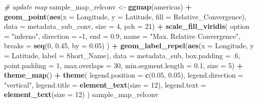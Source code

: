 \documentclass[
]{article}
\newenvironment{Shaded}{\begin{snugshade}}{\end{snugshade}}
\newcommand{\AttributeTok}[1]{\textcolor[rgb]{0.13,0.29,0.53}{#1}}
\newcommand{\CommentTok}[1]{\textcolor[rgb]{0.56,0.35,0.01}{\textit{#1}}}
\newcommand{\DecValTok}[1]{\textcolor[rgb]{0.00,0.00,0.81}{#1}}
\newcommand{\FloatTok}[1]{\textcolor[rgb]{0.00,0.00,0.81}{#1}}
\newcommand{\FunctionTok}[1]{\textcolor[rgb]{0.13,0.29,0.53}{\textbf{#1}}}
\newcommand{\NormalTok}[1]{#1}
\newcommand{\OtherTok}[1]{\textcolor[rgb]{0.56,0.35,0.01}{#1}}
\newcommand{\SpecialCharTok}[1]{\textcolor[rgb]{0.81,0.36,0.00}{\textbf{#1}}}
\newcommand{\StringTok}[1]{\textcolor[rgb]{0.31,0.60,0.02}{#1}}
\begin{document}
\begin{Shaded}
\begin{Highlighting}[]
\CommentTok{\# update map}
\NormalTok{sample\_map\_relconv }\OtherTok{\textless{}{-}} \FunctionTok{ggmap}\NormalTok{(americas) }\SpecialCharTok{+}
  \FunctionTok{geom\_point}\NormalTok{(}\FunctionTok{aes}\NormalTok{(}\AttributeTok{x =}\NormalTok{ Longitude, }\AttributeTok{y =}\NormalTok{ Latitude, }\AttributeTok{fill =}\NormalTok{ Relative\_Convergence), }\AttributeTok{data =}\NormalTok{ metadata\_sub\_conv, }\AttributeTok{size =} \DecValTok{4}\NormalTok{, }\AttributeTok{pch =} \DecValTok{21}\NormalTok{) }\SpecialCharTok{+}
  \FunctionTok{scale\_fill\_viridis}\NormalTok{(}
    \AttributeTok{option =} \StringTok{"inferno"}\NormalTok{, }\AttributeTok{direction =} \SpecialCharTok{{-}}\DecValTok{1}\NormalTok{, }\AttributeTok{end =} \FloatTok{0.9}\NormalTok{,}
    \AttributeTok{name =} \StringTok{"Max. Relative Convergence"}\NormalTok{,}
    \AttributeTok{breaks =} \FunctionTok{seq}\NormalTok{(}\DecValTok{0}\NormalTok{, }\FloatTok{0.45}\NormalTok{, }\AttributeTok{by =} \FloatTok{0.05}\NormalTok{)}
\NormalTok{  ) }\SpecialCharTok{+}
  \FunctionTok{geom\_label\_repel}\NormalTok{(}\FunctionTok{aes}\NormalTok{(}\AttributeTok{x =}\NormalTok{ Longitude, }\AttributeTok{y =}\NormalTok{ Latitude, }\AttributeTok{label =}\NormalTok{ Short\_Name), }\AttributeTok{data =}\NormalTok{ metadata\_sub, }\AttributeTok{box.padding =}\NormalTok{ .}\DecValTok{6}\NormalTok{, }\AttributeTok{point.padding =} \DecValTok{1}\NormalTok{, }\AttributeTok{max.overlaps =} \DecValTok{30}\NormalTok{, }\AttributeTok{min.segment.length =} \FloatTok{0.1}\NormalTok{, }\AttributeTok{size =} \DecValTok{5}\NormalTok{) }\SpecialCharTok{+}
  \FunctionTok{theme\_map}\NormalTok{() }\SpecialCharTok{+}
  \FunctionTok{theme}\NormalTok{(}
    \AttributeTok{legend.position =} \FunctionTok{c}\NormalTok{(}\FloatTok{0.05}\NormalTok{, }\FloatTok{0.05}\NormalTok{),}
    \AttributeTok{legend.direction =} \StringTok{"vertical"}\NormalTok{,}
    \AttributeTok{legend.title =} \FunctionTok{element\_text}\NormalTok{(}\AttributeTok{size =} \DecValTok{12}\NormalTok{),}
    \AttributeTok{legend.text =} \FunctionTok{element\_text}\NormalTok{(}\AttributeTok{size =} \DecValTok{12}\NormalTok{)}
\NormalTok{  )}
\NormalTok{sample\_map\_relconv}
\end{Highlighting}
\end{Shaded}
\end{document}
